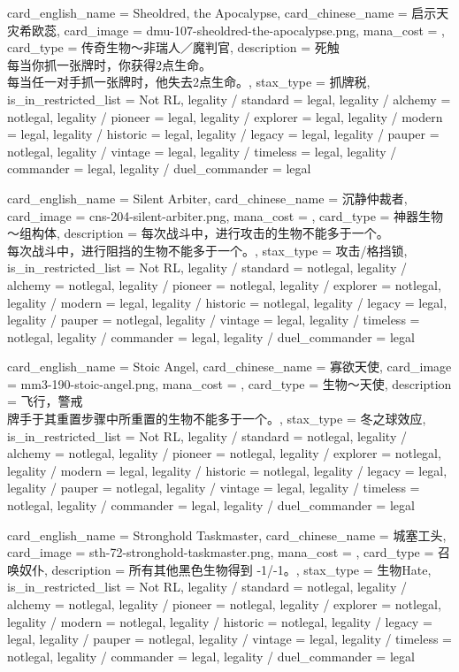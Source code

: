 \documentclass[lang = cn, color = black, 10pt]{AllThatStax}
\begin{document}
\card
{
	card_english_name = {Sheoldred, the Apocalypse},
	card_chinese_name = {启示天灾希欧蕊},
	card_image = dmu-107-sheoldred-the-apocalypse.png,
	mana_cost = ,
	card_type = 传奇生物～非瑞人／魔判官,
	description = {死触\\
每当你抓一张牌时，你获得2点生命。\\
每当任一对手抓一张牌时，他失去2点生命。},
	stax_type = 抓牌税,
	is_in_restricted_list = Not RL,
	legality / standard = legal,
	legality / alchemy = notlegal,
	legality / pioneer = legal,
	legality / explorer = legal,
	legality / modern = legal,
	legality / historic = legal,
	legality / legacy = legal,
	legality / pauper = notlegal,
	legality / vintage = legal,
	legality / timeless = legal,
	legality / commander = legal,
	legality / duel_commander = legal
}

\card
{
	card_english_name = {Silent Arbiter},
	card_chinese_name = {沉静仲裁者},
	card_image = cns-204-silent-arbiter.png,
	mana_cost = ,
	card_type = 神器生物～组构体,
	description = {每次战斗中，进行攻击的生物不能多于一个。\\
每次战斗中，进行阻挡的生物不能多于一个。},
	stax_type = 攻击/格挡锁,
	is_in_restricted_list = Not RL,
	legality / standard = notlegal,
	legality / alchemy = notlegal,
	legality / pioneer = notlegal,
	legality / explorer = notlegal,
	legality / modern = legal,
	legality / historic = notlegal,
	legality / legacy = legal,
	legality / pauper = notlegal,
	legality / vintage = legal,
	legality / timeless = notlegal,
	legality / commander = legal,
	legality / duel_commander = legal
}

\card
{
	card_english_name = {Stoic Angel},
	card_chinese_name = {寡欲天使},
	card_image = mm3-190-stoic-angel.png,
	mana_cost = ,
	card_type = 生物～天使,
	description = {飞行，警戒\\
牌手于其重置步骤中所重置的生物不能多于一个。},
	stax_type = 冬之球效应,
	is_in_restricted_list = Not RL,
	legality / standard = notlegal,
	legality / alchemy = notlegal,
	legality / pioneer = notlegal,
	legality / explorer = notlegal,
	legality / modern = legal,
	legality / historic = notlegal,
	legality / legacy = legal,
	legality / pauper = notlegal,
	legality / vintage = legal,
	legality / timeless = notlegal,
	legality / commander = legal,
	legality / duel_commander = legal
}

\card
{
	card_english_name = {Stronghold Taskmaster},
	card_chinese_name = {城塞工头},
	card_image = sth-72-stronghold-taskmaster.png,
	mana_cost = ,
	card_type = 召唤奴仆,
	description = {所有其他黑色生物得到 -1/-1。},
	stax_type = 生物Hate,
	is_in_restricted_list = Not RL,
	legality / standard = notlegal,
	legality / alchemy = notlegal,
	legality / pioneer = notlegal,
	legality / explorer = notlegal,
	legality / modern = notlegal,
	legality / historic = notlegal,
	legality / legacy = legal,
	legality / pauper = notlegal,
	legality / vintage = legal,
	legality / timeless = notlegal,
	legality / commander = legal,
	legality / duel_commander = legal
}
\end{document}
